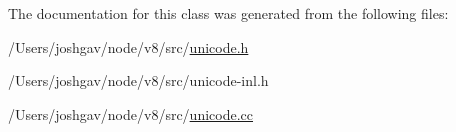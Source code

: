 The documentation for this class was generated from the following files\+:\begin{DoxyCompactItemize}
\item 
/\+Users/joshgav/node/v8/src/\hyperlink{unicode_8h}{unicode.\+h}\item 
/\+Users/joshgav/node/v8/src/unicode-\/inl.\+h\item 
/\+Users/joshgav/node/v8/src/\hyperlink{unicode_8cc}{unicode.\+cc}\end{DoxyCompactItemize}
